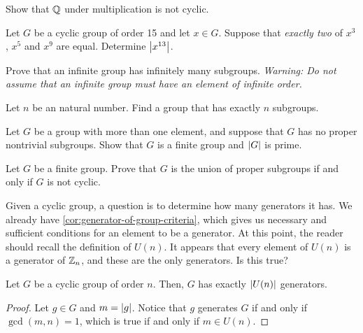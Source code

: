 \documentclass[./algebra-notes.tex]{subfiles}
\begin{document}
\begin{exercise}
    Show that $\mathbb{Q}$ under multiplication is not cyclic.
\end{exercise}

\begin{exercise}
    Let $G$ be a cyclic group of order 15 and let $x \in G$. Suppose that
    \emph{exactly two} of $x^3$, $x^5$ and $x^9$ are equal. Determine
    $\abs{x^{13}}$.
\end{exercise}

\begin{exercise}
    Prove that an infinite group has infinitely many subgroups.
    \textit{Warning: Do not assume that an infinite group must have an element of infinite order.}
\end{exercise}

\begin{exercise}
    Let $n$ be an natural number. Find a group that has exactly $n$ subgroups.
\end{exercise}

\begin{prob}
    Let $G$ be a group with more than one element, and suppose that $G$ has no
    proper nontrivial subgroups. Show that $G$ is a finite group and $\abs G$ is
    prime.
\end{prob}

\begin{prob}
    Let $G$ be a finite group. Prove that $G$ is the union of proper subgroups if
    and only if $G$ is not cyclic.
\end{prob}

Given a cyclic group, a question is to determine how many generators it has. We
already have \cref{cor:generator-of-group-criteria}, which gives us necessary
and sufficient conditions for an element to be a generator. At this point, the
reader should recall the definition of $U(n)$. It appears that every element of
$U(n)$ is a generator of $\mathbb{Z}_n$, and these are the only generators. Is this
true? 

\begin{proposition}
    Let $G$ be a cyclic group of order $n$. Then, $G$ has exactly $\abs{U(n)}$
    generators.
\end{proposition}
\begin{proof}
    Let $g \in G$ and $m = \abs g$. Notice that $g$ generates $G$ if and only if
    $\gcd(m, n) = 1$, which is true if and only if $m \in U(n)$. 
\end{proof}
\end{document}
